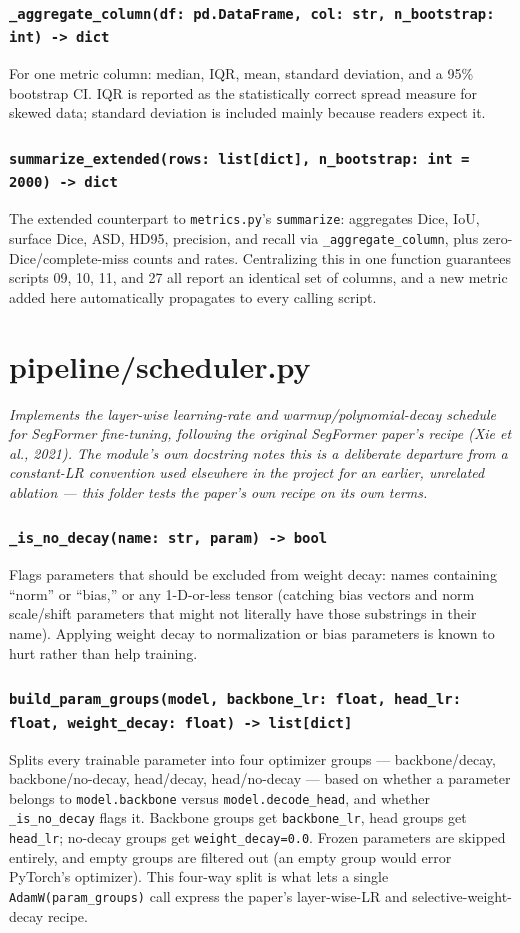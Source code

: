 \documentclass[11pt]{article}
\newcommand{\role}[1]{\par\noindent\textit{#1}\par\vspace{0.5em}}
\newcommand{\func}[1]{\subsubsection*{\texttt{#1}}}
\begin{document}
\func{\_aggregate\_column(df: pd.DataFrame, col: str, n\_bootstrap: int) -> dict}
For one metric column: median, IQR, mean, standard deviation, and a 95\%
bootstrap CI. IQR is reported as the statistically correct spread measure for
skewed data; standard deviation is included mainly because readers expect it.

\func{summarize\_extended(rows: list[dict], n\_bootstrap: int = 2000) -> dict}
The extended counterpart to \texttt{metrics.py}'s \texttt{summarize}: aggregates
Dice, IoU, surface Dice, ASD, HD95, precision, and recall via
\texttt{\_aggregate\_column}, plus zero-Dice/complete-miss counts and rates.
Centralizing this in one function guarantees scripts 09, 10, 11, and 27 all
report an identical set of columns, and a new metric added here automatically
propagates to every calling script.

\newpage
\section{pipeline/scheduler.py}
\role{Implements the layer-wise learning-rate and warmup/polynomial-decay
schedule for SegFormer fine-tuning, following the original SegFormer paper's
recipe (Xie et al., 2021). The module's own docstring notes this is a
deliberate departure from a constant-LR convention used elsewhere in the
project for an earlier, unrelated ablation --- this folder tests the paper's
own recipe on its own terms.}

\func{\_is\_no\_decay(name: str, param) -> bool}
Flags parameters that should be excluded from weight decay: names containing
``norm'' or ``bias,'' or any 1-D-or-less tensor (catching bias vectors and norm
scale/shift parameters that might not literally have those substrings in their
name). Applying weight decay to normalization or bias parameters is known to
hurt rather than help training.

\func{build\_param\_groups(model, backbone\_lr: float, head\_lr: float, weight\_decay: float) -> list[dict]}
Splits every trainable parameter into four optimizer groups ---
backbone/decay, backbone/no-decay, head/decay, head/no-decay --- based on
whether a parameter belongs to \texttt{model.backbone} versus
\texttt{model.decode\_head}, and whether \texttt{\_is\_no\_decay} flags it.
Backbone groups get \texttt{backbone\_lr}, head groups get \texttt{head\_lr};
no-decay groups get \texttt{weight\_decay=0.0}. Frozen parameters are skipped
entirely, and empty groups are filtered out (an empty group would error
PyTorch's optimizer). This four-way split is what lets a single
\texttt{AdamW(param\_groups)} call express the paper's layer-wise-LR and
selective-weight-decay recipe.
\end{document}
